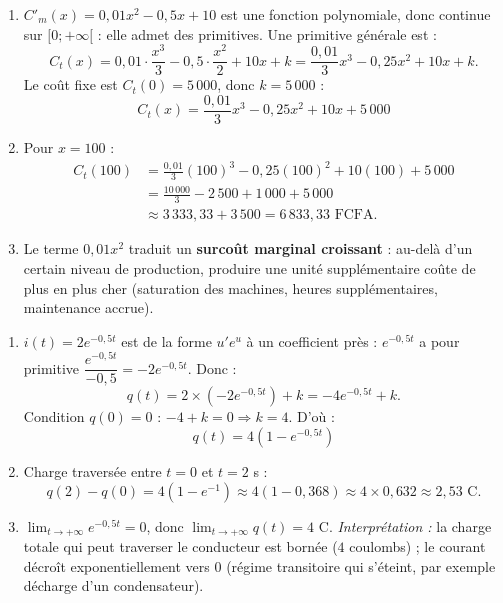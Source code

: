 \documentclass[11pt]{article}
\begin{document}
\begin{corrige}
\begin{enumerate}
    \item $C'_m(x)=0{,}01x^2-0{,}5x+10$ est une fonction polynomiale, donc continue sur $[0;+\infty[$ : elle admet des primitives. Une primitive générale est :
    \[ C_t(x) = 0{,}01\cdot\frac{x^3}{3} - 0{,}5\cdot\frac{x^2}{2} + 10x + k = \frac{0{,}01}{3}x^3 - 0{,}25x^2 + 10x + k. \]
    Le coût fixe est $C_t(0)=5\,000$, donc $k=5\,000$ :
    \[ \boxed{C_t(x) = \frac{0{,}01}{3}x^3 - 0{,}25x^2 + 10x + 5\,000} \]
    \item Pour $x=100$ :
    \begin{align*}
    C_t(100) &= \frac{0{,}01}{3}(100)^3 - 0{,}25(100)^2 + 10(100) + 5\,000 \\
    &= \frac{10\,000}{3} - 2\,500 + 1\,000 + 5\,000 \\
    &\approx 3\,333{,}33 + 3\,500 = 6\,833{,}33 \text{ FCFA}.
    \end{align*}
    \item Le terme $0{,}01x^2$ traduit un \textbf{surcoût marginal croissant} : au-delà d'un certain niveau de production, produire une unité supplémentaire coûte de plus en plus cher (saturation des machines, heures supplémentaires, maintenance accrue).
\end{enumerate}
\end{corrige}

\begin{corrige}
\begin{enumerate}
    \item $i(t)=2e^{-0{,}5t}$ est de la forme $u'e^{u}$ à un coefficient près : $e^{-0{,}5t}$ a pour primitive $\dfrac{e^{-0{,}5t}}{-0{,}5}=-2e^{-0{,}5t}$. Donc :
    \[ q(t) = 2\times\left(-2e^{-0{,}5t}\right) + k = -4e^{-0{,}5t} + k. \]
    Condition $q(0)=0$ : $-4+k=0 \Rightarrow k=4$. D'où :
    \[ \boxed{q(t) = 4\left(1 - e^{-0{,}5t}\right)} \]
    \item Charge traversée entre $t=0$ et $t=2$ s :
    \[ q(2)-q(0) = 4\left(1-e^{-1}\right) \approx 4(1-0{,}368) \approx 4\times 0{,}632 \approx 2{,}53 \text{ C}. \]
    \item $\displaystyle\lim_{t\to+\infty} e^{-0{,}5t}=0$, donc $\displaystyle\lim_{t\to+\infty} q(t)=4$ C. \emph{Interprétation :} la charge totale qui peut traverser le conducteur est bornée ($4$ coulombs) ; le courant décroît exponentiellement vers $0$ (régime transitoire qui s'éteint, par exemple décharge d'un condensateur).
\end{enumerate}
\end{corrige}
\end{document}
